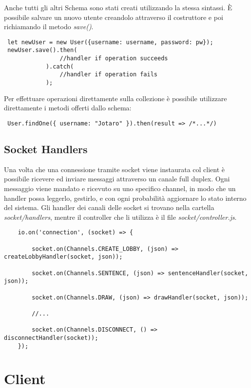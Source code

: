 \noindent Anche tutti gli altri Schema sono stati creati utilizzando la stessa sintassi. È possibile salvare un nuovo utente creandolo attraverso il costruttore e poi richiamando il metodo \textit{save()}.
\begin{verbatim}
 let newUser = new User({username: username, password: pw});
 newUser.save().then(
                //handler if operation succeeds
            ).catch(
                //handler if operation fails
            );
\end{verbatim}

\noindent Per effettuare operazioni direttamente sulla collezione è possibile utilizzare direttamente i metodi offerti dallo schema:

\begin{verbatim}
 User.findOne({ username: "Jotaro" }).then(result => /*...*/)
\end{verbatim}
\subsection{Socket Handlers}
Una volta che una connessione tramite socket viene instaurata col client è possibile ricevere ed inviare messaggi attraverso un canale full duplex. Ogni messaggio viene mandato e ricevuto su uno specifico channel, in modo che un handler possa leggerlo, gestirlo, e con ogni probabilità aggiornare lo stato interno del sistema.
Gli handler dei canali delle socket si trovano nella cartella \textit{socket/handlers}, mentre il controller che li utilizza è il file \textit{socket/controller.js}.
\begin{verbatim}
    io.on('connection', (socket) => {

        socket.on(Channels.CREATE_LOBBY, (json) => createLobbyHandler(socket, json));
    
        socket.on(Channels.SENTENCE, (json) => sentenceHandler(socket, json));

        socket.on(Channels.DRAW, (json) => drawHandler(socket, json));
        
        //...
        
        socket.on(Channels.DISCONNECT, () => disconnectHandler(socket));
    });
\end{verbatim}

\section{Client}

